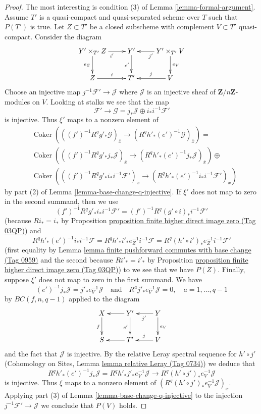 \documentclass{amsart}
\theoremstyle{plain}
\theoremstyle{definition}
\theoremstyle{remark}
\numberwithin{equation}{subsection}
\def\Coker{\mathop{\mathrm{Coker}}}
\begin{document}
\begin{proof}
\medskip\noindent
The most interesting is condition (3) of Lemma \ref{lemma-formal-argument}.
Assume $T'$ is a quasi-compact and quasi-separated scheme over $T$
such that $P(T')$ is true.
Let $Z \subset T'$ be a closed subscheme with complement $V \subset T'$
quasi-compact. Consider the diagram
$$
\xymatrix{
Y' \times_{T'} Z \ar[d]_{e_Z} \ar[r]_{i'} &
Y' \ar[d]_{e'} &
Y' \times_{T'} V \ar[l]^{j'} \ar[d]^{e_V} \\
Z \ar[r]^i &
T' &
V \ar[l]_j
}
$$
Choose an injective map $j^{-1}\mathcal{F}' \to \mathcal{J}$
where $\mathcal{J}$ is an injective sheaf of $\mathbf{Z}/n\mathbf{Z}$-modules
on $V$. Looking at stalks we see that the map
$$
\mathcal{F}' \to \mathcal{G} = j_*\mathcal{J} \oplus i_*i^{-1}\mathcal{F}'
$$
is injective. Thus $\xi'$ maps to a nonzero element of
\begin{align*}
& \Coker\left(
((f')^{-1}R^qg'_*\mathcal{G})_{\overline{x}}
\to
(R^qh'_*(e')^{-1}\mathcal{G})_{\overline{x}}
\right) = \\
&
\Coker\left(
((f')^{-1}R^qg'_*j_*\mathcal{J})_{\overline{x}}
\to
(R^qh'_*(e')^{-1}j_*\mathcal{J})_{\overline{x}}
\right) \oplus \\
& \Coker\left(
((f')^{-1}R^qg'_*i_*i^{-1}\mathcal{F}')_{\overline{x}}
\to
(R^qh'_*(e')^{-1}i_*i^{-1}\mathcal{F}')_{\overline{x}}
\right)
\end{align*}
by part (2) of Lemma \ref{lemma-base-change-q-injective}.
If $\xi'$ does not map to zero in the second summand, then
we use
$$
(f')^{-1}R^qg'_*i_*i^{-1}\mathcal{F}' =
(f')^{-1}R^q(g' \circ i)_*i^{-1}\mathcal{F}'
$$
(because $Ri_* = i_*$ by
Proposition \href{https://stacks.math.columbia.edu/tag/03QP}{proposition finite higher direct image zero (Tag 03QP)}) and
$$
R^qh'_*(e')^{-1}i_*i^{-1}\mathcal{F} =
R^qh'_*i'_*e_Z^{-1}i^{-1}\mathcal{F} =
R^q(h' \circ i')_*e_Z^{-1}i^{-1}\mathcal{F}'
$$
(first equality by
Lemma \href{https://stacks.math.columbia.edu/tag/0959}{lemma finite pushforward commutes with base change (Tag 0959)}
and the second because
$Ri'_* = i'_*$ by
Proposition \href{https://stacks.math.columbia.edu/tag/03QP}{proposition finite higher direct image zero (Tag 03QP)})
to we see that we have $P(Z)$.
Finally, suppose $\xi'$ does not map to zero in the first summand.
We have
$$
(e')^{-1}j_*\mathcal{J} = j'_*e_V^{-1}\mathcal{J}
\quad\text{and}\quad
R^aj'_*e_V^{-1}\mathcal{J} = 0, \quad a = 1, \ldots, q - 1
$$
by $BC(f, n, q - 1)$ applied to the diagram
$$
\xymatrix{
X \ar[d]_f & Y' \ar[l] \ar[d]_{e'} & Y \ar[l]^{j'} \ar[d]^{e_V} \\
S & T' \ar[l] & V \ar[l]_j
}
$$
and the fact that $\mathcal{J}$ is injective.
By the relative Leray spectral sequence for $h' \circ j'$
(Cohomology on Sites, Lemma \href{https://stacks.math.columbia.edu/tag/0734}{lemma relative Leray (Tag 0734)})
we deduce that
$$
R^qh'_*(e')^{-1}j_*\mathcal{J} =
R^qh'_*j'_*e_V^{-1}\mathcal{J}
\longrightarrow
R^q(h' \circ j')_* e_V^{-1}\mathcal{J}
$$
is injective. Thus $\xi$ maps to a nonzero element of
$(R^q(h' \circ j')_* e_V^{-1}\mathcal{J})_{\overline{x}}$.
Applying part (3) of Lemma \ref{lemma-base-change-q-injective}
to the injection $j^{-1}\mathcal{F}' \to \mathcal{J}$
we conclude that $P(V)$ holds.
\end{proof}
\end{document}
